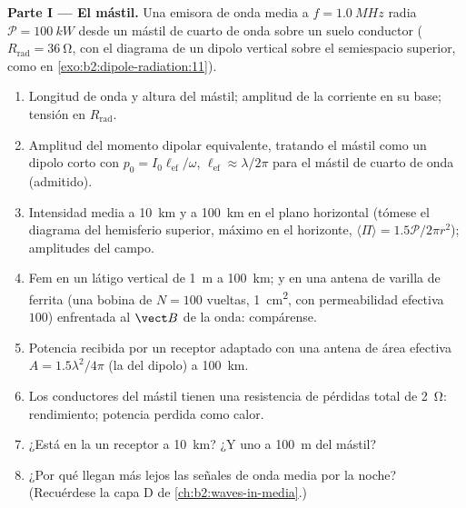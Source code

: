 \begin{problem}
\label{pb:b2:dipole-radiation:1}

\medskip
\noindent\textbf{Parte I --- El mástil.}
Una emisora de onda media a $f = \qty{1.0}{MHz}$ radia $\mathcal P = \qty{100}{kW}$
desde un mástil de cuarto de onda sobre un suelo conductor ($R_{\text{rad}} = \qty{36}{\ohm}$,
con el diagrama de un dipolo vertical sobre el semiespacio superior, como en
\cref{exo:b2:dipole-radiation:11}).
\begin{enumerate}
  \item Longitud de onda y altura del mástil; amplitud de la corriente en su
        base; tensión en $R_{\text{rad}}$.
  \item Amplitud del momento dipolar equivalente, tratando el mástil como un
        dipolo corto con $p_0 = I_0\ell_{\text{ef}}/\omega$, $\ell_{\text{ef}} \approx
        \lambda/2\pi$ para el mástil de cuarto de onda (admitido).
  \item Intensidad media a \qty{10}{km} y a \qty{100}{km} en el plano
        horizontal (tómese el diagrama del hemisferio superior, máximo en el
        horizonte, $\langle\Pi\rangle = 1.5\mathcal P/2\pi r^2$); amplitudes del campo.
  \item Fem en un látigo vertical de \qty{1}{m} a \qty{100}{km}; y en una antena
        de varilla de ferrita (una bobina de $N = 100$ vueltas, \qty{1}{cm^2}, con
        permeabilidad efectiva $100$) enfrentada al $\vect B$ de la onda: compárense.
  \item Potencia recibida por un receptor adaptado con una antena de
        área efectiva $A = 1.5\lambda^2/4\pi$ (la del dipolo) a \qty{100}{km}.
  \item Los conductores del mástil tienen una resistencia de pérdidas total de
        \qty{2}{\ohm}: rendimiento; potencia perdida como calor.
  \item ¿Está en la  un receptor a \qty{10}{km}? ¿Y uno a
        \qty{100}{m} del mástil?
  \item ¿Por qué llegan más lejos las señales de onda media por la noche? (Recuérdese la
        capa D de \cref{ch:b2:waves-in-media}.)
\end{enumerate}


\end{problem}
